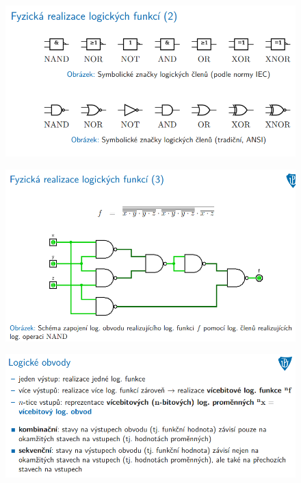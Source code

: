 \documentclass[10pt,a4paper]{article}
\begin{document}
\begin{figure} [h]
	\includegraphics[scale=0.65]{img/prvni_odstavec/otazka2/fyzicka_realizace_logickych_funkci2.png}	
\end{figure}

\begin{figure} [h]
	\includegraphics[scale=0.65]{img/prvni_odstavec/otazka2/fyzicka_realizace_logickych_funkci3.png}	
\end{figure}

\begin{figure} [h]
	\includegraphics[scale=0.65]{img/prvni_odstavec/otazka2/logicke_obvody.png}	
\end{figure}
\end{document}

